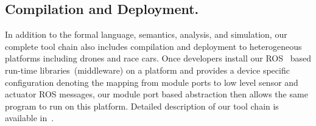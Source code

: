 \subsection{Compilation and Deployment.}
In addition to the formal language, semantics, analysis, and simulation,
our complete tool chain also includes compilation and deployment to heterogeneous platforms including drones and race cars.
Once developers install our ROS~\cite{ros} based run-time libraries~(middleware) on a platform
and provides a device specific configuration denoting the mapping from \lgname module ports
to low level sensor and actuator ROS messages,
our module port based abstraction then allows the same \lgname program to run on this platform.
Detailed description of our tool chain is available in~\cite{ghosh2019cyphyhouse}.
